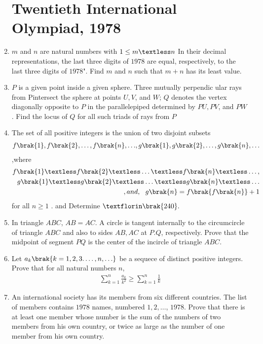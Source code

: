 \documentclass[12pt,-letter paper] {article}
\begin{document}
\begin{enumerate}
	\section*{Twentieth International Olympiad, 1978}
\item $m$ and $n$ are natural numbers with $1 \leq m \textless n$ In their decimal representations, the last three digits of $1978$ are equal, respectively, to the last three digits of $1978$". Find $m$ and $n$ such that $m+n$ has its least value.
\item $P$ is a given point inside a given sphere. Three mutually perpendic ular rays from Pintersect the sphere at points $U, V$, and $W$; $Q$ denotes the vertex diagonally opposite to $P$ in the parallelepiped determined by $PU, PV$, and $PW$. Find the locus of $Q$ for all such triads of rays from $P$
\item The set of all positive integers is the union of two disjoint subsets 
\begin{align}
{f\brak{1}, f\brak{2} ,\ldots,f\brak{n},\ldots} ,{ g\brak{1},g\brak{2},\ldots,g\brak{n},\ldots} 
\end{align},where
\begin{align}
f\brak{1}\textless f\brak{2} \textless \ldots \textless f\brak{n} \textless \ldots,\\ g\brak{1} \textless g\brak{2} \textless \ldots \textless g\brak{n}\textless \ldots\\, and,\ \   g\brak{n}=f\brak{f\brak{n}} + 1
\end{align}
for all $n \geq 1$
. and Determine $ƒ\brak{240}.$
\item In triangle $ABC$, $AB = AC$. A circle is tangent internally to the circumcircle of triangle $ABC$ and also to sides $AB, AC$ at $P. Q$, respectively. Prove that the midpoint of segment $PQ$ is the center of the incircle of triangle $ABC.$
\item Let ${a_{k}\brak{k=1,2,3.\ldots,n,\ldots}}$ be a sequece of distinct positive integers. Prove that for all natural numbers $n$,\begin{align}\sum_{k=1}^{n} \frac{a_{k}}{k^2} \geq \sum_{k=1}^{n} \frac{1}{k}\end{align}
\item An international society has its members from six different countries. The list of members contains $1978$ names, numbered $1, 2,\ldots$, $1978$. Prove that there is at least one member whose number is the sum of the numbers of two members from his own country, or twice as large as the number of one member from his own country.


\end{enumerate}
\end{document}
